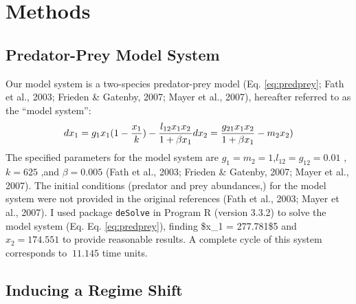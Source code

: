 \documentclass[12pt,twoside,openany]{reedthesis}
\begin{document}
\hypertarget{methods-1}{%
\section{Methods}\label{methods-1}}

\hypertarget{predator-prey-model-system}{%
\subsection{Predator-Prey Model System}\label{predator-prey-model-system}}

Our model system is a two-species predator-prey model (Eq. \eqref{eq:predprey}; Fath et al., 2003; Frieden \& Gatenby, 2007; Mayer et al., 2007), hereafter referred to as the ``model system'':
\begin{equation} 
  dx_1 = g_{1}x_{1}(1-\frac{x_1}{k})- \frac{l_{12} x_{1} x_{2}}{1+\beta x_{1}} \\
  dx_2 = \frac{g_{21}x_1 x_2}{1+\beta x_1} - m_2 x_2)
  \label{eq:predprey}
\end{equation}
The specified parameters for the model system are \(g_1=m_2=1\),\(l_{12}=g_{12}= 0.01\) ,\(k=625\) ,and \(\beta=0.005\) (Fath et al., 2003; Frieden \& Gatenby, 2007; Mayer et al., 2007). The initial conditions (predator and prey abundances,) for the model system were not provided in the original references (Fath et al., 2003; Mayer et al., 2007). I used package \texttt{deSolve} in Program R (version 3.3.2) to solve the model system (Eq. Eq. \eqref{eq:predprey}), finding \$x\_1 = 277.781\$5 and \(x_2= 174.551\) to provide reasonable results. A complete cycle of this system corresponds to \(~11.145\) time units.

\hypertarget{inducing-a-regime-shift}{%
\subsection{Inducing a Regime Shift}\label{inducing-a-regime-shift}}
\end{document}

